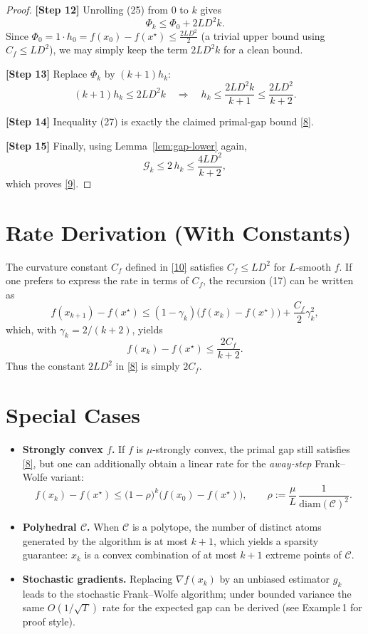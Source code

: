 \documentclass{article}
\newcommand{\gap}{\mathcal{G}}
\newcommand{\diam}{\mathrm{diam}}
\begin{document}
\begin{proof}
\noindent\textbf{[Step 12]} Unrolling (25) from $0$ to $k$ gives
\[
\Phi_{k}\le \Phi_{0}+2L D^{2}k .
\tag{26}
\]
Since $\Phi_{0}=1\cdot h_{0}=f(x_0)-f(x^\star)\le \frac{2L D^{2}}{2}$ (a trivial upper bound using $C_f\le LD^{2}$), we may simply keep the term $2L D^{2}k$ for a clean bound.

\noindent\textbf{[Step 13]} Replace $\Phi_{k}$ by $(k+1)h_k$:
\[
(k+1)h_k\le 2L D^{2}k \quad\Longrightarrow\quad 
h_k\le \frac{2L D^{2}k}{k+1}\le \frac{2L D^{2}}{k+2}.
\tag{27}
\]

\noindent\textbf{[Step 14]} Inequality (27) is exactly the claimed primal‑gap bound \eqref{8}.

\noindent\textbf{[Step 15]} Finally, using Lemma~\ref{lem:gap-lower} again,
\[
\gap_k \le 2\,h_k \le \frac{4L D^{2}}{k+2},
\]
which proves \eqref{9}.  \qedhere
\end{proof}

\section*{Rate Derivation (With Constants)}
The curvature constant $C_f$ defined in \eqref{10} satisfies $C_f\le L D^{2}$ for $L$‑smooth $f$.  
If one prefers to express the rate in terms of $C_f$, the recursion (17) can be written as
\[
f(x_{k+1})-f(x^\star)\le (1-\gamma_k)\bigl(f(x_k)-f(x^\star)\bigr)+\frac{C_f}{2}\gamma_k^{2},
\]
which, with $\gamma_k=2/(k+2)$, yields
\[
f(x_k)-f(x^\star)\le \frac{2C_f}{k+2}.
\]
Thus the constant $2LD^{2}$ in \eqref{8} is simply $2C_f$.

\section*{Special Cases}
\begin{itemize}
\item \textbf{Strongly convex $f$.} If $f$ is $\mu$‑strongly convex, the primal gap still satisfies \eqref{8}, but one can additionally obtain a linear rate for the \emph{away‑step} Frank–Wolfe variant:
\[
f(x_k)-f(x^\star)\le \bigl(1-\rho\bigr)^{k}\bigl(f(x_0)-f(x^\star)\bigr),\qquad 
\rho:=\frac{\mu}{L}\,\frac{1}{\diam(\mathcal{C})^{2}} .
\]
\item \textbf{Polyhedral $\mathcal{C}$.} When $\mathcal{C}$ is a polytope, the number of distinct atoms generated by the algorithm is at most $k+1$, which yields a sparsity guarantee: $x_k$ is a convex combination of at most $k+1$ extreme points of $\mathcal{C}$.
\item \textbf{Stochastic gradients.} Replacing $\nabla f(x_k)$ by an unbiased estimator $g_k$ leads to the stochastic Frank–Wolfe algorithm; under bounded variance the same $O(1/\sqrt{T})$ rate for the expected gap can be derived (see Example 1 for proof style).
\end{itemize}
\end{document}
